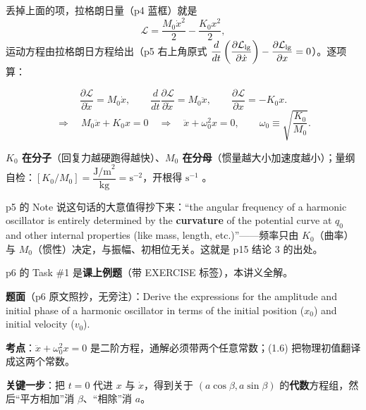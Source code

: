 \documentclass[11pt]{ctexart}
\begin{document}

丢掉上面的项，拉格朗日量（p4 蓝框）就是
\[
\mathcal{L}=\frac{M_0\dot x^2}{2}-\frac{K_0x^2}{2},
\tag{1.4}
\]
运动方程由拉格朗日方程给出（p5 右上角原式 $\dfrac{d}{dt}\left(\dfrac{\partial\mathcal{L}_{\rm lg}}{\partial\dot x}\right)-\dfrac{\partial\mathcal{L}_{\rm lg}}{\partial x}=0$）。逐项算：

\[
\frac{\partial\mathcal{L}}{\partial\dot x}=M_0\dot x,\qquad
\frac{d}{dt}\frac{\partial\mathcal{L}}{\partial\dot x}=M_0\ddot x,\qquad
\frac{\partial\mathcal{L}}{\partial x}=-K_0x .
\]
\[
\Longrightarrow\quad M_0\ddot x+K_0x=0
\quad\Longrightarrow\quad \ddot x+\omega_0^2x=0,\qquad
\omega_0\equiv\sqrt{\frac{K_0}{M_0}} .
\tag{1.5}
\]

\textbf{$K_0$ 在分子}（回复力越硬跑得越快）、\textbf{$M_0$ 在分母}（惯量越大小加速度越小）；量纲自检：$[K_0/M_0]=\dfrac{\text{J/m}^2}{\text{kg}}=\text{s}^{-2}$，开根得 $\text{s}^{-1}$ \checkmark。

p5 的 Note 说这句话的大意值得抄下来：“the angular frequency of a harmonic oscillator is entirely determined by the \textbf{curvature} of the potential curve at $q_0$ and other internal properties (like mass, length, etc.)”——频率只由 $K_0$（曲率）与 $M_0$（惯性）决定，与振幅、初相位无关。这就是 p15 结论 3 的出处。


p6 的 Task \#1 是\textbf{课上例题}（带 EXERCISE 标签），本讲义全解。

\textbf{题面}（p6 原文照抄，无旁注）：Derive the expressions for the amplitude and initial phase of a harmonic oscillator in terms of the initial position ($x_0$) and initial velocity ($v_0$).

\textbf{考点}：$\ddot x+\omega_0^2x=0$ 是二阶方程，通解必须带两个任意常数；(1.6) 把物理初值翻译成这两个常数。

\textbf{关键一步}：把 $t=0$ 代进 $x$ 与 $\dot x$，得到关于 $(a\cos\beta,a\sin\beta)$ 的\textbf{代数}方程组，然后“平方相加”消 $\beta$、“相除”消 $a$。
\end{document}
